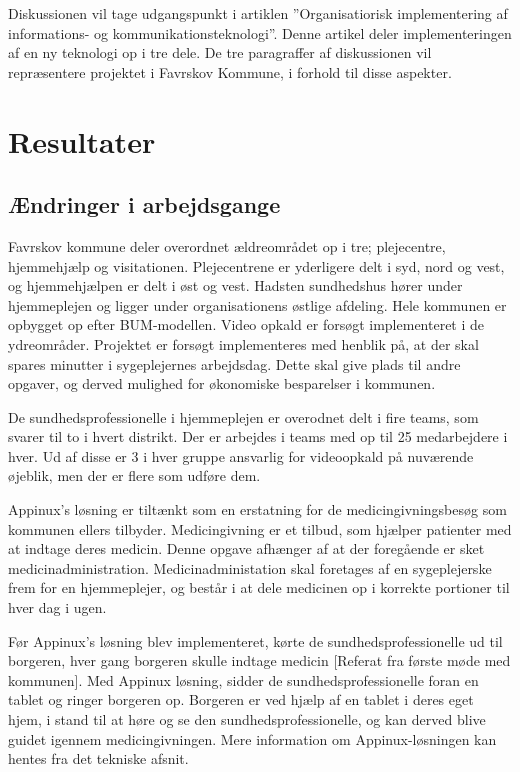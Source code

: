 Diskussionen vil tage udgangspunkt i artiklen ”Organisatiorisk implementering af informations- og kommunikationsteknologi”. Denne artikel deler implementeringen af en ny teknologi op i tre dele. De tre paragraffer af diskussionen vil repræsentere projektet i Favrskov Kommune, i forhold til disse aspekter. 

\section{Resultater}
\subsection{Ændringer i arbejdsgange}
Favrskov kommune deler overordnet ældreområdet op i tre; plejecentre, hjemmehjælp og visitationen. Plejecentrene er yderligere delt i syd, nord og vest, og hjemmehjælpen er delt i øst og vest. Hadsten sundhedshus hører under hjemmeplejen og ligger under organisationens østlige afdeling. Hele kommunen er opbygget op efter BUM-modellen. Video opkald er forsøgt implementeret i de ydreområder. Projektet er forsøgt implementeres med henblik på, at der skal spares minutter i sygeplejernes arbejdsdag. Dette skal give plads til andre opgaver, og derved mulighed for økonomiske besparelser i kommunen. 

De sundhedsprofessionelle i hjemmeplejen er overodnet delt i fire teams, som svarer til to i hvert distrikt. Der er arbejdes i teams med op til 25 medarbejdere i hver. Ud af disse er 3 i hver gruppe ansvarlig for videoopkald på nuværende øjeblik, men der er flere som udføre dem.  

Appinux’s løsning er tiltænkt som en erstatning for de medicingivningsbesøg som kommunen ellers tilbyder. Medicingivning er et tilbud, som hjælper patienter med at indtage deres medicin. Denne opgave afhænger af at der foregående er sket medicinadministration. Medicinadministation skal foretages af en sygeplejerske frem for en hjemmeplejer, og består i at dele medicinen op i korrekte portioner til hver dag i ugen.

Før Appinux’s løsning blev implementeret, kørte de sundhedsprofessionelle ud til borgeren, hver gang borgeren skulle indtage medicin [Referat fra første møde med kommunen]. Med Appinux løsning, sidder de sundhedsprofessionelle foran en tablet og ringer borgeren op. Borgeren er ved hjælp af en tablet i deres eget hjem, i stand til at høre og se den sundhedsprofessionelle, og kan derved blive guidet igennem medicingivningen. Mere information om Appinux-løsningen kan hentes fra det tekniske afsnit. 

